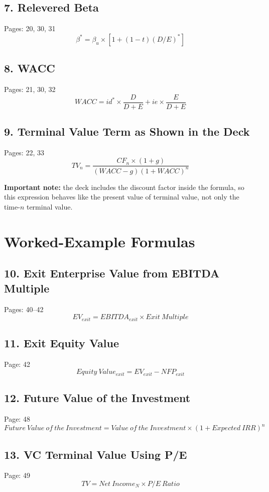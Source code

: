 \documentclass[11pt]{article}
\begin{document}
\subsection*{7. Relevered Beta}
Pages: 20, 30, 31
\[
\beta^* = \beta_u \times [1 + (1 - t)(D/E)^*]
\]

\subsection*{8. WACC}
Pages: 21, 30, 32
\[
WACC = id^* \times \frac{D}{D+E} + ie \times \frac{E}{D+E}
\]

\subsection*{9. Terminal Value Term as Shown in the Deck}
Pages: 22, 33
\[
TV_n = \frac{CF_n \times (1 + g)}{(WACC - g)(1 + WACC)^n}
\]

\textbf{Important note:} the deck includes the discount factor inside the formula, so this expression behaves like the present value of terminal value, not only the time-$n$ terminal value.

\section*{Worked-Example Formulas}

\subsection*{10. Exit Enterprise Value from EBITDA Multiple}
Pages: 40--42
\[
EV_{exit} = EBITDA_{exit} \times Exit\ Multiple
\]

\subsection*{11. Exit Equity Value}
Page: 42
\[
Equity\ Value_{exit} = EV_{exit} - NFP_{exit}
\]

\subsection*{12. Future Value of the Investment}
Page: 48
\[
Future\ Value\ of\ the\ Investment = Value\ of\ the\ Investment \times (1 + Expected\ IRR)^n
\]

\subsection*{13. VC Terminal Value Using P/E}
Page: 49
\[
TV = Net\ Income_N \times P/E\ Ratio
\]
\end{document}
